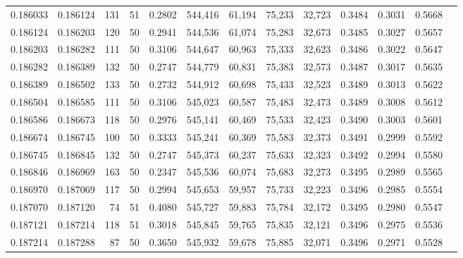 \begin{tabular}{rrrrrrrrrrrrr}
0.186033 & 0.186124 &   131 &  51 &                                     0.2802 & 544,416 &  61,194 &  75,233 &  32,723 & 0.3484 & 0.3031 & 0.5668 \\
0.186124 & 0.186203 &   120 &  50 &                                     0.2941 & 544,536 &  61,074 &  75,283 &  32,673 & 0.3485 & 0.3027 & 0.5657 \\
0.186203 & 0.186282 &   111 &  50 &                                     0.3106 & 544,647 &  60,963 &  75,333 &  32,623 & 0.3486 & 0.3022 & 0.5647 \\
0.186282 & 0.186389 &   132 &  50 &                                     0.2747 & 544,779 &  60,831 &  75,383 &  32,573 & 0.3487 & 0.3017 & 0.5635 \\
0.186389 & 0.186502 &   133 &  50 &                                     0.2732 & 544,912 &  60,698 &  75,433 &  32,523 & 0.3489 & 0.3013 & 0.5622 \\
0.186504 & 0.186585 &   111 &  50 &                                     0.3106 & 545,023 &  60,587 &  75,483 &  32,473 & 0.3489 & 0.3008 & 0.5612 \\
0.186586 & 0.186673 &   118 &  50 &                                     0.2976 & 545,141 &  60,469 &  75,533 &  32,423 & 0.3490 & 0.3003 & 0.5601 \\
0.186674 & 0.186745 &   100 &  50 &                                     0.3333 & 545,241 &  60,369 &  75,583 &  32,373 & 0.3491 & 0.2999 & 0.5592 \\
0.186745 & 0.186845 &   132 &  50 &                                     0.2747 & 545,373 &  60,237 &  75,633 &  32,323 & 0.3492 & 0.2994 & 0.5580 \\
0.186846 & 0.186969 &   163 &  50 &                                     0.2347 & 545,536 &  60,074 &  75,683 &  32,273 & 0.3495 & 0.2989 & 0.5565 \\
0.186970 & 0.187069 &   117 &  50 &                                     0.2994 & 545,653 &  59,957 &  75,733 &  32,223 & 0.3496 & 0.2985 & 0.5554 \\
0.187070 & 0.187120 &    74 &  51 &                                     0.4080 & 545,727 &  59,883 &  75,784 &  32,172 & 0.3495 & 0.2980 & 0.5547 \\
0.187121 & 0.187214 &   118 &  51 &                                     0.3018 & 545,845 &  59,765 &  75,835 &  32,121 & 0.3496 & 0.2975 & 0.5536 \\
0.187214 & 0.187288 &    87 &  50 &                                     0.3650 & 545,932 &  59,678 &  75,885 &  32,071 & 0.3496 & 0.2971 & 0.5528 \\

\end{tabular}
